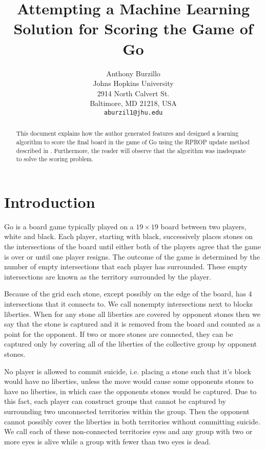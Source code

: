 \documentclass[11pt,letterpaper]{article}
\title{Attempting a Machine Learning Solution for Scoring the Game of Go}
\author{Anthony Burzillo\\
  Johns Hopkins University\\
  2914 North Calvert St.\\
  Baltimore, MD 21218, USA\\
  {\tt aburzil1@jhu.edu}}
\date{}
\begin{document}
\maketitle

\begin{abstract}
  This document explains how the author generated features and designed a learning algorithm to score the final
  board in the game of Go using the RPROP update method described in \cite{RB:93}. Furthermore, the reader
  will observe that the algorithm was inadequate to solve the scoring problem.
\end{abstract}

\section{Introduction}

Go is a board game typically played on a $19 \times 19$ board between two players, white and black. Each player,
starting with black, successively places stones on the intersections of the board until either both of the players
agree that the game is over or until one player resigns. The outcome of the game is determined by the number of
empty intersections that each player has surrounded. These empty intersections are known as the territory
surrounded by the player.

Because of the grid each stone, except possibly on the edge of the board, has 4 intersections that it connects to. We
call nonempty intersections next to blocks liberties. When for any stone all liberties are covered by opponent stones
then we say that the stone is captured and it is removed from the board and counted as a point for the opponent. If
two or more stones are connected, they can be captured only by covering all of the liberties of the collective group by
opponent stones.

No player is allowed to commit suicide, i.e. placing a stone such that it's block would have no liberties, unless the
move would cause some opponents stones to have no liberties, in which case the opponents stones would be
captured. Due to this fact, each player can construct groups that cannot be captured by surrounding two
unconnected territories within the group. Then the opponent cannot possibly cover the liberties in both territories
without committing suicide. We call each of these non-connected territories eyes and any group with two or more
eyes is alive while a group with fewer than two eyes is dead.
\end{document}
